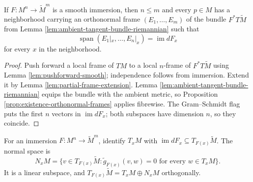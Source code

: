 \begin{proposition}
\label{prop:adapted-orthonormal-frames-immersed}





If $F:M^n\to\widetilde M^m$ is a smooth immersion, then $n\le m$ and every $p\in M$ has a neighborhood carrying an orthonormal frame $(E_1,\ldots,E_m)$ of the bundle $F^*T\widetilde M$ from Lemma \ref{lem:ambient-tangent-bundle-riemannian} such that
\[
\operatorname{span}(E_1|_x,\ldots,E_n|_x)=\operatorname{im}dF_x
\]
for every $x$ in the neighborhood.
\end{proposition}
\begin{proof}

\sketch Push forward a local frame of $TM$ to a local $n$-frame of $F^*T\widetilde M$ using Lemma \ref{lem:pushforward-smooth}; independence follows from immersion. Extend it by Lemma \ref{lem:partial-frame-extension}. Lemma \ref{lem:ambient-tangent-bundle-riemannian} equips the bundle with the ambient metric, so Proposition \ref{prop:existence-orthonormal-frames} applies fibrewise. The Gram--Schmidt flag puts the first $n$ vectors in $\operatorname{im}dF_x$; both subspaces have dimension $n$, so they coincide.
\end{proof}

\begin{definition}
\label{def:normal-space}




For an immersion $F:M^n\to\widetilde M^m$, identify $T_xM$ with $\operatorname{im}dF_x\subseteq T_{F(x)}\widetilde M$. The normal space is
\[
N_xM=\{v\in T_{F(x)}\widetilde M:\widetilde g_{F(x)}(v,w)=0\text{ for every }w\in T_xM\}.
\]
It is a linear subspace, and $T_{F(x)}\widetilde M=T_xM\oplus N_xM$ orthogonally.
\end{definition}

